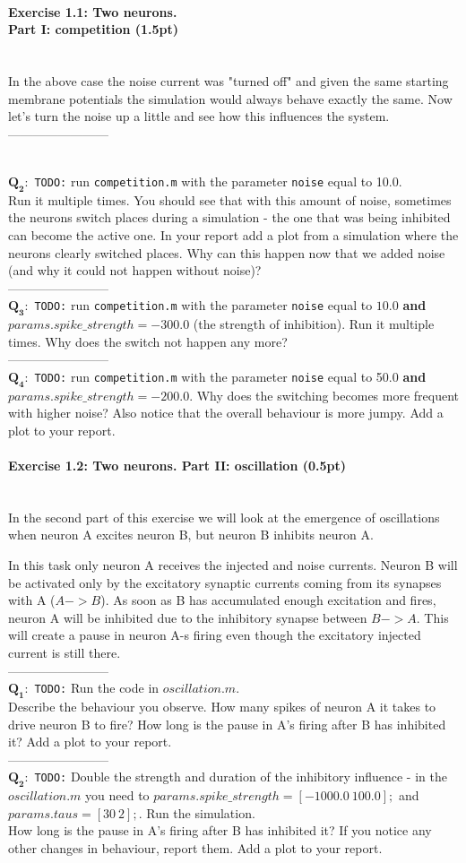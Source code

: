 \documentclass[a4paper,11pt]{article}
\newenvironment{exercise}[3]{\paragraph{Exercise #1: #2 (#3pt)}\ \\}{
\medskip}
\newcommand{\question}[2]{\setlength\parindent{10mm}\ \\$\mathbf{Q_#1:}$ #2\ \\}
\begin{document}
\begin{exercise}{1.1}{Two neurons. \\Part I: competition}{1.5}
In the above case the noise current was "turned off" and given the same starting membrane potentials the simulation would always behave exactly the same. Now let's turn the noise up a little and see how this influences the system.\\
------------------------

\question{2}{ 
\texttt{TODO:} run \texttt{competition.m} with the parameter \texttt{noise} equal to 10.0.\\ 
Run it multiple times. You should see that with this amount of noise, sometimes the neurons switch places during a simulation - the one that was being inhibited can become the active one. In your report add a plot from a simulation where the neurons clearly switched places. Why can this happen now that we added noise (and why it could not happen without noise)?}
------------------------
\question{3}{ 
\texttt{TODO:} run \texttt{competition.m} with the parameter \texttt{noise} equal to $10.0$ \textbf{and} $params.spike\_strength = -300.0$ (the strength of inhibition).
Run it multiple times. Why does the switch not happen any more?}
------------------------
\question{4}{ 
\texttt{TODO:} run \texttt{competition.m} with the parameter \texttt{noise} equal to 50.0 \textbf{and} $params.spike\_strength = -200.0$.
Why does the switching becomes more frequent with higher noise? Also notice that the overall behaviour is more jumpy. Add a plot to your report.}

\end{exercise}

\begin{exercise}{1.2}{Two neurons. Part II: oscillation}{0.5}
In the second part of this exercise we will look at the emergence of oscillations when neuron A excites neuron B, but neuron B inhibits neuron A.

In this task only neuron A receives the injected and noise currents. Neuron B will be activated only by the excitatory synaptic currents coming from its synapses with A ($A->B$). As soon as B has accumulated enough excitation and fires, neuron A will be inhibited due to the inhibitory synapse between $B->A$. This will create a pause in neuron A-s firing even though the excitatory injected current is still there.\\
------------------------
\question{1}{\texttt{TODO:} Run the code in $oscillation.m$.\\ Describe the behaviour you observe. How many spikes of neuron A it takes to drive neuron B to fire? How long is the pause in A's firing after B has inhibited it? Add a plot to your report.}
------------------------
\question{2}{ \texttt{TODO:} Double the strength and duration of the inhibitory influence - in the $oscillation.m$ you need to $params.spike\_strength=[-1000.0\ 100.0];$ and $params.taus = [30\ 2];$. Run the simulation.\\ How long is the pause in A's firing after B has inhibited it? If you notice any other changes in behaviour, report them. Add a plot to your report.}


\end{exercise}
\end{document}
